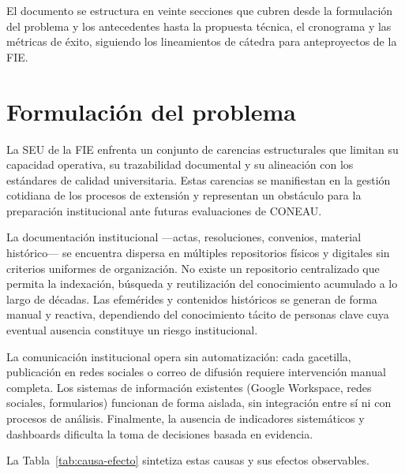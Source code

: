 \documentclass[a4paper, 12pt]{article}
\begin{document}
El documento se estructura en veinte secciones que cubren desde la formulaci\'on del problema y los antecedentes hasta la propuesta t\'ecnica, el cronograma y las m\'etricas de \'exito, siguiendo los lineamientos de c\'atedra para anteproyectos de la \ac{FIE}.

\section{Formulaci\'on del problema}

La \ac{SEU} de la \ac{FIE} enfrenta un conjunto de carencias estructurales que limitan su capacidad operativa, su trazabilidad documental y su alineaci\'on con los est\'andares de calidad universitaria. Estas carencias se manifiestan en la gesti\'on cotidiana de los procesos de extensi\'on y representan un obst\'aculo para la preparaci\'on institucional ante futuras evaluaciones de \ac{CONEAU}.

La documentaci\'on institucional ---actas, resoluciones, convenios, material hist\'orico--- se encuentra dispersa en m\'ultiples repositorios f\'isicos y digitales sin criterios uniformes de organizaci\'on. No existe un repositorio centralizado que permita la indexaci\'on, b\'usqueda y reutilizaci\'on del conocimiento acumulado a lo largo de d\'ecadas. Las efem\'erides y contenidos hist\'oricos se generan de forma manual y reactiva, dependiendo del conocimiento t\'acito de personas clave cuya eventual ausencia constituye un riesgo institucional.

La comunicaci\'on institucional opera sin automatizaci\'on: cada gacetilla, publicaci\'on en redes sociales o correo de difusi\'on requiere intervenci\'on manual completa. Los sistemas de informaci\'on existentes (Google Workspace, redes sociales, formularios) funcionan de forma aislada, sin integraci\'on entre s\'i ni con procesos de an\'alisis. Finalmente, la ausencia de indicadores sistem\'aticos y dashboards dificulta la toma de decisiones basada en evidencia.

La Tabla~\ref{tab:causa-efecto} sintetiza estas causas y sus efectos observables.
\end{document}
